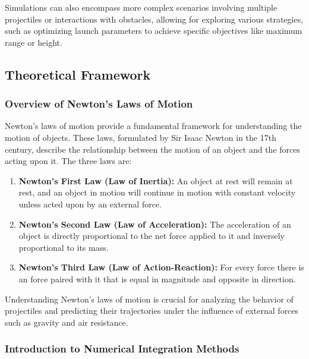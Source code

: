 \documentclass[11pt]{article}
\begin{document}
Simulations can also encompass more complex scenarios involving multiple
projectiles or interactions with obstacles, allowing for exploring
various strategies, such as optimizing launch parameters to achieve
specific objectives like maximum range or height.

    \hypertarget{theoretical-framework}{%
\subsection{Theoretical Framework}\label{theoretical-framework}}

\hypertarget{overview-of-newtons-laws-of-motion}{%
\subsubsection{Overview of Newton's Laws of
Motion}\label{overview-of-newtons-laws-of-motion}}

Newton's laws of motion provide a fundamental framework for
understanding the motion of objects. These laws, formulated by Sir Isaac
Newton in the 17th century, describe the relationship between the motion
of an object and the forces acting upon it. The three laws are:

\begin{enumerate}
\def\labelenumi{\arabic{enumi}.}
\item
  \textbf{Newton's First Law (Law of Inertia):} An object at rest will
  remain at rest, and an object in motion will continue in motion with
  constant velocity unless acted upon by an external force.
\item
  \textbf{Newton's Second Law (Law of Acceleration):} The acceleration
  of an object is directly proportional to the net force applied to it
  and inversely proportional to its mass.
\item
  \textbf{Newton's Third Law (Law of Action-Reaction):} For every force
  there is an force paired with it that is equal in magnitude and
  opposite in direction.
\end{enumerate}

Understanding Newton's laws of motion is crucial for analyzing the
behavior of projectiles and predicting their trajectories under the
influence of external forces such as gravity and air resistance.

\hypertarget{introduction-to-numerical-integration-methods}{%
\subsubsection{Introduction to Numerical Integration
Methods}\label{introduction-to-numerical-integration-methods}}
\end{document}
